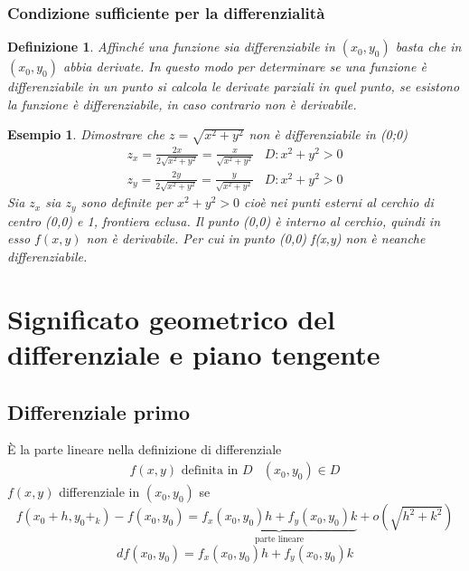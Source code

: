 \documentclass{book}
\newtheorem{defi}{Definizione}
\newtheorem{esempio}{Esempio}
\begin{document}
\subsubsection{Condizione sufficiente per la differenzialità}
\begin{defi}
  Affinché una funzione sia differenziabile in $(x_0,y_0)$ basta che in $(x_0,y_0)$ abbia derivate.
  In questo modo per determinare se una funzione è differenziabile in un punto si calcola le
  derivate parziali in quel punto, se esistono la funzione è differenziabile, in caso contrario
  non è derivabile.
\end{defi}
\begin{esempio}
  Dimostrare che $z=\sqrt{x^2+y^2}$ non è differenziabile in (0;0)
  \begin{equation*}
    \begin{matrix}
      z_x=\frac{2x}{2\sqrt{x^2+y^2}} = \frac{x}{\sqrt{x^2+y^2}} & D: x^2+y^2>0 \\
      z_y=\frac{2y}{2\sqrt{x^2+y^2}} = \frac{y}{\sqrt{x^2+y^2}} & D: x^2+y^2>0
    \end{matrix}
  \end{equation*}
  Sia $z_x$ sia $z_y$ sono definite per $x^2+y^2>0$ cioè nei punti esterni al cerchio di centro (0,0)
  e 1, frontiera eclusa. Il punto (0,0) è interno al cerchio, quindi in esso $f(x,y)$ non è derivabile. Per cui in punto (0,0) f(x,y) non è neanche differenziabile.
\end{esempio}
\section{Significato geometrico del differenziale e piano tengente}
\subsection{Differenziale primo}
È la parte lineare nella definizione di differenziale
\begin{equation*}
  \begin{matrix}
    f(x,y) \text{ definita in } D & (x_0,y_0)\in D
  \end{matrix}
\end{equation*}
$f(x,y)$ differenziale in $(x_0,y_0)$ se
\begin{equation*}
  f(x_0+h,y_0+_k)-f(x_0,y_0)=\underbrace{f_x(x_0,y_0)h+f_y(x_0,y_0)k}_{\text{parte lineare}}
  +o(\sqrt{h^2+k^2})
\end{equation*}
\begin{equation*}
  df(x_0,y_0)=f_x(x_0,y_0)h+f_y(x_0,y_0)k
\end{equation*}
\end{document}
